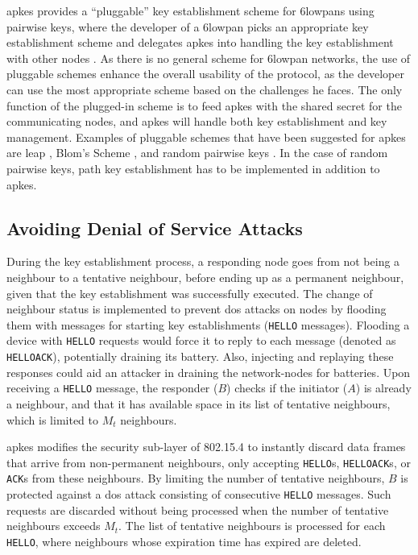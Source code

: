 \gls{apkes} provides a ``pluggable'' key establishment scheme for \gls{6lowpan}s using pairwise keys, where the developer of a \gls{6lowpan} picks an appropriate key establishment scheme and delegates \gls{apkes} into handling the key establishment with other nodes \cite{krentz20136lowpan}. As there is no general scheme for \gls{6lowpan} networks, the use of pluggable schemes enhance the overall usability of the protocol, as the developer can use the most appropriate scheme based on the challenges he faces. The only function of the plugged-in scheme is to feed \gls{apkes} with the shared secret for the communicating nodes, and \gls{apkes} will handle both key establishment and key management. Examples of pluggable schemes that have been suggested for \gls{apkes} are \gls{leap} \cite{zhu2006leap+}, Blom's Scheme \cite{blom1984optimal}, and random pairwise keys \cite{chan2003random}. In the case of random pairwise keys, path key establishment has to be implemented in addition to \gls{apkes}.

\subsection{Avoiding Denial of Service Attacks}

During the key establishment process, a responding node goes from not being a neighbour to a tentative neighbour, before ending up as a permanent neighbour, given that the key establishment was successfully executed. The change of neighbour status is implemented to prevent \gls{dos} attacks on nodes by flooding them with messages for starting key establishments (\texttt{HELLO} messages). Flooding a device with \texttt{HELLO} requests would force it to reply to each message (denoted as \texttt{HELLOACK}), potentially draining its battery. Also, injecting and replaying these responses could aid an attacker in draining the network-nodes for batteries. Upon receiving a \texttt{HELLO} message, the responder ($B$) checks if the initiator ($A$) is already a neighbour, and that it has available space in its list of tentative neighbours, which is limited to $M_t$ neighbours. 

\gls{apkes} modifies the security sub-layer of 802.15.4 to instantly discard data frames that arrive from non-permanent neighbours, only accepting \texttt{HELLO}s, \texttt{HELLOACK}s, or \texttt{ACK}s from these neighbours. By limiting the number of tentative neighbours, $B$ is protected against a \gls{dos} attack consisting of consecutive \texttt{HELLO} messages. Such requests are discarded without being processed when the number of tentative neighbours exceeds $M_t$. The list of tentative neighbours is processed for each \texttt{HELLO}, where neighbours whose expiration time has expired are deleted.


